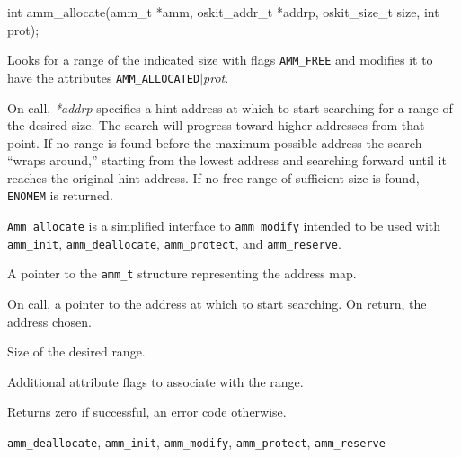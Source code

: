 \begin{apisyn}

	\funcproto int amm_allocate(amm_t *amm,
			\inoutparam oskit_addr_t *addrp,
			oskit_size_t size, int prot);
\end{apisyn}
\begin{apidesc}
	Looks for a range of the indicated size with flags {\tt AMM_FREE}
	and modifies it to have the attributes {\tt AMM_ALLOCATED}$|$\emph{prot}.

	On call,
	\emph{*addrp} specifies a hint address at which to start searching
	for a range of the desired size.
	The search will progress toward higher addresses from that point.
	If no range is found before the maximum possible address
	the search ``wraps around,'' starting from the lowest address
	and searching forward until it reaches the original hint address.
	If no free range of sufficient size is found, {\tt ENOMEM}
	is returned.

	{\tt Amm_allocate} is a simplified interface to {\tt amm_modify}
	intended to be used with {\tt amm_init}, {\tt amm_deallocate},
	{\tt amm_protect}, and {\tt amm_reserve}.
\end{apidesc}
\begin{apiparm}
	\item[amm]
		A pointer to the {\tt amm_t} structure
		representing the address map.
	\item[addrp]
		On call, a pointer to the address at which to start searching.
		On return, the address chosen.
	\item[size]
		Size of the desired range.
	\item[prot]
		Additional attribute flags to associate with the range.
\end{apiparm}
\begin{apiret}
	Returns zero if successful, an error code otherwise.
\end{apiret}
\begin{apirel}
	{\tt amm_deallocate}, {\tt amm_init}, {\tt amm_modify},
	{\tt amm_protect}, {\tt amm_reserve}
\end{apirel}


